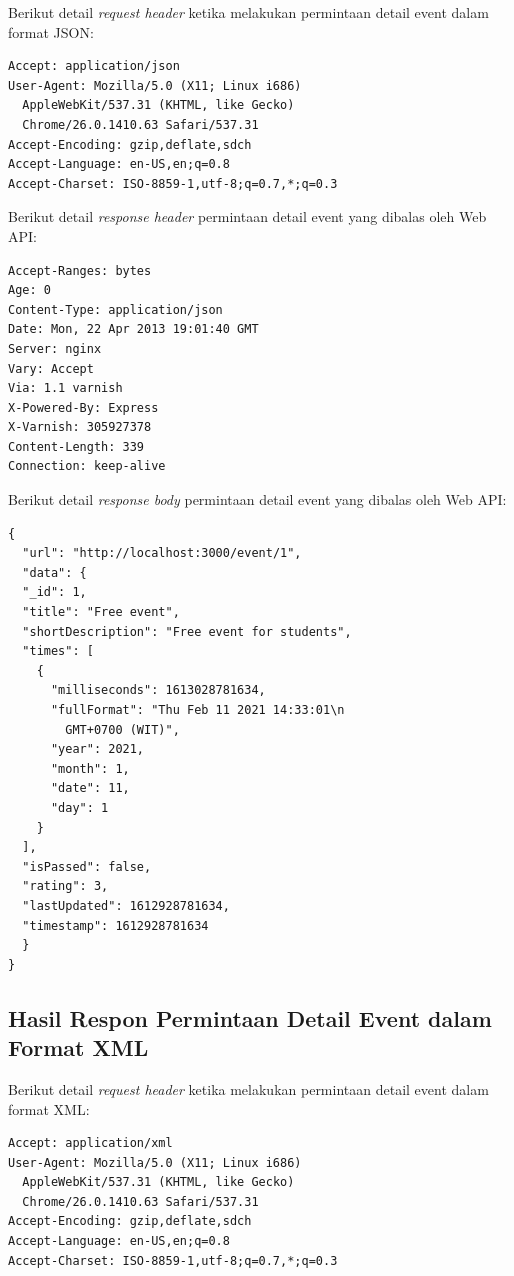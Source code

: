 \documentclass[a4paper, 12pt, oneside]{report}
\begin{document}
\onehalfspacing Berikut detail \textit{request header} ketika melakukan permintaan detail event dalam format JSON:

\begin{lstlisting}[frame=single]
Accept: application/json
User-Agent: Mozilla/5.0 (X11; Linux i686)
  AppleWebKit/537.31 (KHTML, like Gecko)
  Chrome/26.0.1410.63 Safari/537.31
Accept-Encoding: gzip,deflate,sdch
Accept-Language: en-US,en;q=0.8
Accept-Charset: ISO-8859-1,utf-8;q=0.7,*;q=0.3
\end{lstlisting}

Berikut detail \textit{response header} permintaan detail event yang dibalas oleh Web API:

\begin{lstlisting}[frame=single]
Accept-Ranges: bytes 
Age: 0 
Content-Type: application/json 
Date: Mon, 22 Apr 2013 19:01:40 GMT 
Server: nginx 
Vary: Accept 
Via: 1.1 varnish 
X-Powered-By: Express
X-Varnish: 305927378
Content-Length: 339 
Connection: keep-alive
\end{lstlisting}

Berikut detail \textit{response body} permintaan detail event yang dibalas oleh Web API:

\begin{lstlisting}[frame=single]
{
  "url": "http://localhost:3000/event/1",
  "data": {
  "_id": 1,
  "title": "Free event",
  "shortDescription": "Free event for students",
  "times": [
    {
      "milliseconds": 1613028781634,
      "fullFormat": "Thu Feb 11 2021 14:33:01\n
        GMT+0700 (WIT)",
      "year": 2021,
      "month": 1,
      "date": 11,
      "day": 1
    }
  ],
  "isPassed": false,
  "rating": 3,
  "lastUpdated": 1612928781634,
  "timestamp": 1612928781634
  }
}
\end{lstlisting}

\subsection{Hasil Respon Permintaan Detail Event dalam Format XML}

Berikut detail \textit{request header} ketika melakukan permintaan detail event dalam format XML:

\begin{lstlisting}[frame=single]
Accept: application/xml
User-Agent: Mozilla/5.0 (X11; Linux i686)
  AppleWebKit/537.31 (KHTML, like Gecko)
  Chrome/26.0.1410.63 Safari/537.31
Accept-Encoding: gzip,deflate,sdch
Accept-Language: en-US,en;q=0.8
Accept-Charset: ISO-8859-1,utf-8;q=0.7,*;q=0.3
\end{lstlisting}
\end{document}
